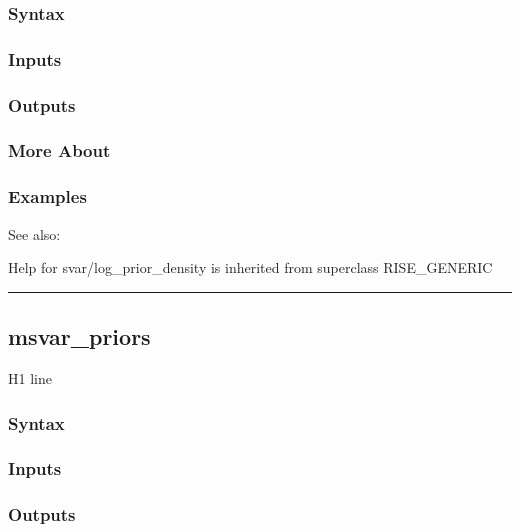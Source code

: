 \documentclass[letterpaper,10pt,english]{sphinxmanual}
\begin{document}
\subsubsection{Syntax}
\label{classes/models/@svar/svar:id59}

\subsubsection{Inputs}
\label{classes/models/@svar/svar:id60}

\subsubsection{Outputs}
\label{classes/models/@svar/svar:id61}

\subsubsection{More About}
\label{classes/models/@svar/svar:id62}

\subsubsection{Examples}
\label{classes/models/@svar/svar:id63}
See also:

Help for svar/log\_prior\_density is inherited from superclass RISE\_GENERIC


\bigskip\hrule{}\bigskip



\subsection{msvar\_priors}
\label{classes/models/@svar/svar:id64}\label{classes/models/@svar/svar:msvar-priors}
H1 line


\subsubsection{Syntax}
\label{classes/models/@svar/svar:id65}

\subsubsection{Inputs}
\label{classes/models/@svar/svar:id66}

\subsubsection{Outputs}
\label{classes/models/@svar/svar:id67}
\end{document}
